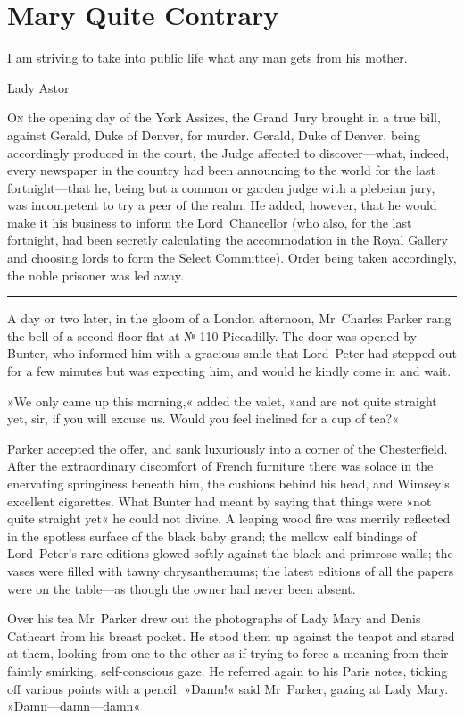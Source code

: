 \chapter{Mary Quite Contrary}

\epigraph{I am striving to take into public life what any man gets from his mother.}{Lady Astor}


\lettrine[lines=4]{O}{n} the opening day of the York Assizes, the Grand Jury brought in a true bill, against Gerald, Duke of Denver, for murder. Gerald, Duke of Denver, being accordingly produced in the court, the Judge affected to discover—what, indeed, every newspaper in the country had been announcing to the world for the last fortnight—that he, being but a common or garden judge with a plebeian jury, was incompetent to try a peer of the realm. He added, however, that he would make it his business to inform the Lord~Chancellor (who also, for the last fortnight, had been secretly calculating the accommodation in the Royal Gallery and choosing lords to form the Select Committee). Order being taken accordingly, the noble prisoner was led away.

\noindent\hfil\rule{0.5\textwidth}{.4pt}\hfil

A day or two later, in the gloom of a London afternoon, Mr~Charles Parker rang the bell of a second-floor flat at № 110 Piccadilly. The door was opened by Bunter, who informed him with a gracious smile that Lord~Peter had stepped out for a few minutes but was expecting him, and would he kindly come in and wait.

»We only came up this morning,« added the valet, »and are not quite straight yet, sir, if you will excuse us. Would you feel inclined for a cup of tea?«

Parker accepted the offer, and sank luxuriously into a corner of the Chesterfield. After the extraordinary discomfort of French furniture there was solace in the enervating springiness beneath him, the cushions behind his head, and Wimsey's excellent cigarettes. What Bunter had meant by saying that things were »not quite straight yet« he could not divine. A leaping wood fire was merrily reflected in the spotless surface of the black baby grand; the mellow calf bindings of Lord~Peter's rare editions glowed softly against the black and primrose walls; the vases were filled with tawny chrysanthemums; the latest editions of all the papers were on the table—as though the owner had never been absent.

Over his tea Mr~Parker drew out the photographs of Lady Mary and Denis Cathcart from his breast pocket. He stood them up against the teapot and stared at them, looking from one to the other as if trying to force a meaning from their faintly smirking, self-conscious gaze. He referred again to his Paris notes, ticking off various points with a pencil.  »Damn!« said Mr~Parker, gazing at Lady Mary. »Damn—damn—damn\longdash«

